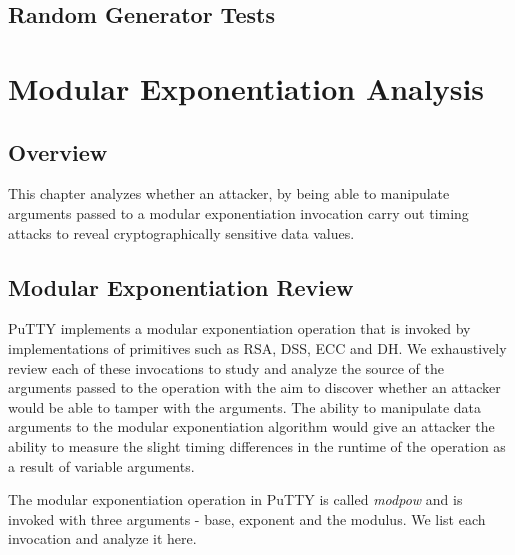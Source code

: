 \documentclass{report}
\begin{document}
\section{Random Generator Tests}

\chapter{Modular Exponentiation Analysis}
\section{Overview}
This chapter analyzes whether an attacker, by being able to manipulate arguments passed to a modular exponentiation invocation carry out timing attacks to reveal cryptographically sensitive data values.
\section{Modular Exponentiation Review}
PuTTY implements a modular exponentiation operation that is invoked by implementations of primitives such as RSA, DSS, ECC and DH. We exhaustively review each of these invocations to study and analyze the source of the arguments passed to the operation with the aim to discover whether an attacker would be able to tamper with the arguments. The ability to manipulate data arguments to the modular exponentiation algorithm would give an attacker the ability to measure the slight timing differences in the runtime of the operation as a result of variable arguments.\par
The modular exponentiation operation in PuTTY is called \textit{modpow} and is invoked with three arguments - base, exponent and the modulus. We list each invocation and analyze it here.\par
\end{document}
